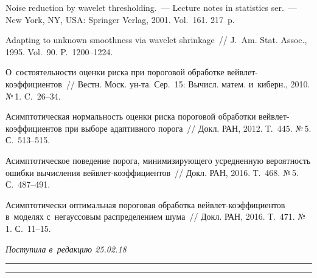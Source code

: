 \begin{multicols}{2}
{{\begin{thebibliography}{99}
 Noise reduction by wavelet thresholding.~--- 
Lecture notes in statistics ser.~---  New York, NY, USA: Springer Verlag, 2001. Vol.~161. 217~p.

 Adapting to unknown smoothness via wavelet shrinkage~// 
J.~Am. Stat. Assoc., 1995. Vol.~90. P.~1200--1224.

 О~состоятельности оценки риска при 
пороговой обработке вейв\-лет-ко\-эф\-фи\-ци\-ен\-тов~// Вестн. Моск. ун-та. Сер.~15: 
Вычисл. матем. и~киберн., 2010. №\,1. C.~26--34.

 Асимптотическая нор\-маль\-ность оцен\-ки риска пороговой 
обработки вейв\-лет-ко\-эф\-фи\-ци\-ен\-тов при выборе адаптивного порога~// 
Докл. РАН, 2012. Т.~445. №\,5. С.~513--515.

 Асимптотическое поведение порога, 
минимизирующего усред\-нен\-ную ве\-ро\-ят\-ность ошиб\-ки вы\-чис\-ле\-ния 
вейв\-лет-ко\-эф\-фи\-ци\-ен\-тов~// 
Докл. РАН, 2016. Т.~468. №\,5. С.~487--491.

 Асимптотически оптимальная пороговая 
обработка вейв\-лет-ко\-эф\-фи\-ци\-ен\-тов в~моделях с~негауссовым 
рас\-пре\-де\-ле\-ни\-ем шума~// Докл. РАН, 2016. Т.~471. №\,1. С.~11--15.

 \end{thebibliography}

 }
 }

\end{multicols}

\vspace*{-6pt}

\hfill{\small\textit{Поступила в~редакцию 25.02.18}}

\vspace*{8pt}



\hrule

\vspace*{2pt}

\hrule



\def\tit{MINIMIZATION OF~ERRORS OF~CALCULATING WAVELET COEFFICIENTS 
WHILE~SOLVING INVERSE PROBLEMS}

